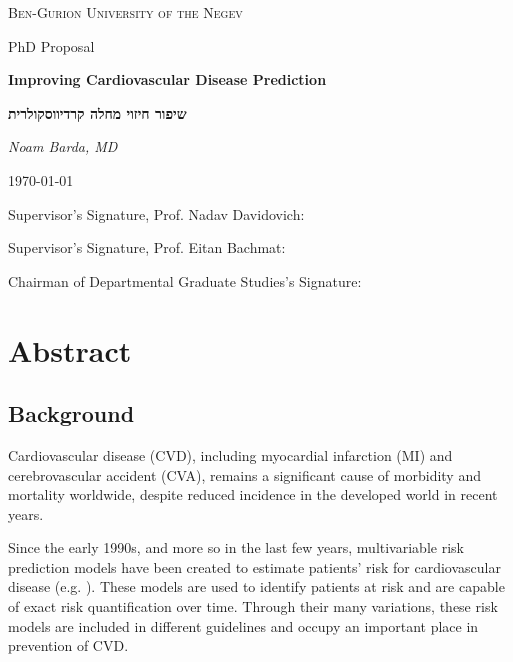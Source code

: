 \documentclass[a4paper,12pt]{article}
\begin{document}
	\begin{titlepage}
		\centering
		{\scshape\LARGE Ben-Gurion University of the Negev\par}
		\vspace{1cm}
		{\Large PhD Proposal\par}
		\vspace{2cm}
		{\huge\bfseries Improving Cardiovascular Disease Prediction\par}
		\vspace{1cm}
		\begin{hebrew}
		{\huge\bfseries שיפור חיזוי מחלה קרדיווסקולרית\par}
		\end{hebrew}
		\vspace{1.5cm}
		{\Large\itshape Noam Barda, MD\par}
		{\large \today\par}
		\vfill
		Supervisor's Signature, Prof. Nadav Davidovich: \underline{\hspace{5cm}}\par
		\vspace{0.5cm}
		Supervisor's Signature, Prof. Eitan Bachmat: \underline{\hspace{5cm}}\par
		\vspace{0.5cm}
		Chairman of Departmental Graduate Studies's Signature: \underline{\hspace{5cm}}\par
		
	\end{titlepage}
	
	\tableofcontents
	\newpage
	
	\section{Abstract}
	
		\subsection{Background}
		
		Cardiovascular disease (CVD), including myocardial infarction (MI) and cerebrovascular accident (CVA), remains a significant cause of morbidity and mortality\cite{ODonnell2016} worldwide, despite reduced incidence in the developed world in recent years\cite{Koton2014,Vangen-Loenne2017}.
		
		Since the early 1990s, and more so in the last few years,  multivariable risk prediction models have been created to estimate patients' risk for cardiovascular disease (e.g. \cite{Wilson1998,Conroy2003,DAgostino2008}). These models are used to identify patients at risk and are capable of exact risk quantification over time\cite{Goff2014}. Through their many variations, these risk models are included in different guidelines and occupy an important place in prevention of CVD\cite{Goff2014}.
	
\end{document}
